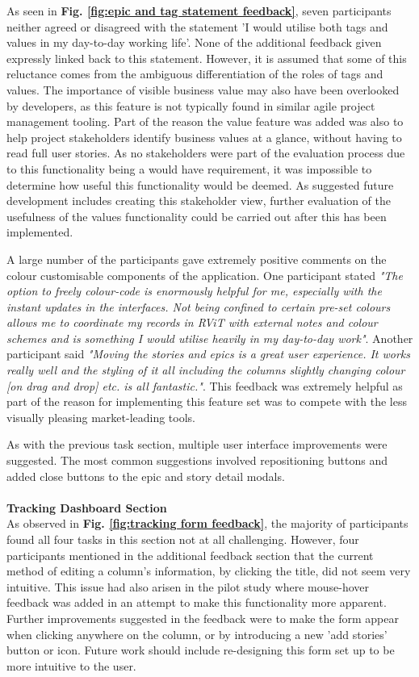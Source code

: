 \documentclass[l4proj.tex]{subfiles}
\begin{document}
As seen in \textbf{Fig. \ref{fig:epic and tag statement feedback}}, seven participants neither agreed or disagreed with the statement 'I would utilise both tags and values in my day-to-day working life'. None of the additional feedback given expressly linked back to this statement. However, it is assumed that some of this reluctance comes from the ambiguous differentiation of the roles of tags and values. The importance of visible business value may also have been overlooked by developers, as this feature is not typically found in similar agile project management tooling. Part of the reason the value feature was added was also to help project stakeholders identify business values at a glance, without having to read full user stories. As no stakeholders were part of the evaluation process due to this functionality being a would have requirement, it was impossible to determine how useful this functionality would be deemed. As suggested future development includes creating this stakeholder view, further evaluation of the usefulness of the values functionality could be carried out after this has been implemented.

A large number of the participants gave extremely positive comments on the colour customisable components of the application. One participant stated \textit{"The option to freely colour-code is enormously helpful for me, especially with the instant updates in the interfaces. Not being confined to certain pre-set colours allows me to coordinate my records in RViT with external notes and colour schemes and is something I would utilise heavily in my day-to-day work"}. Another participant said \textit{"Moving the stories and epics is a great user experience. It works really well and the styling of it all including the columns slightly changing colour [on drag and drop] etc. is all fantastic."}. This feedback was extremely helpful as part of the reason for implementing this feature set was to compete with the less visually pleasing market-leading tools.

As with the previous task section, multiple user interface improvements were suggested. The most common suggestions involved repositioning buttons and added close buttons to the epic and story detail modals. \\
\\
\textbf{Tracking Dashboard Section}\\
As observed in \textbf{Fig. \ref{fig:tracking form feedback}}, the majority of participants found all four tasks in this section not at all challenging. However, four participants mentioned in the additional feedback section that the current method of editing a column's information, by clicking the title, did not seem very intuitive. This issue had also arisen in the pilot study where mouse-hover feedback was added in an attempt to make this functionality more apparent. Further improvements suggested in the feedback were to make the form appear when clicking anywhere on the column, or by introducing a new 'add stories' button or icon. Future work should include re-designing this form set up to be more intuitive to the user.
\end{document}
